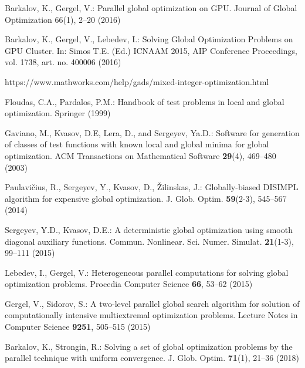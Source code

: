 \documentclass[runningheads]{llncs}
\begin{document}
\begin{thebibliography}{10}
Barkalov, K., Gergel, V.: Parallel global optimization on GPU. Journal of Global Optimization
66(1), 2--20 (2016)

Barkalov, K., Gergel, V., Lebedev, I.: Solving Global Optimization Problems on GPU Cluster.
In: Simos T.E. (Ed.) ICNAAM 2015, AIP Conference Proceedings, vol. 1738, art. no. 400006
(2016)

https://www.mathworks.com/help/gads/mixed-integer-optimization.html

Floudas, C.A., Pardalos, P.M.:  Handbook of test problems in local and global optimization.
Springer (1999)  %

 Gaviano, M., Kvasov, D.E, Lera, D., and Sergeyev, Ya.D.: Software for
generation of classes of test functions with known local and global minima for global
optimization. ACM Transactions on Mathematical Software \textbf{29}(4), 469--480 (2003)

Paulavi\v{c}ius, R., Sergeyev, Y., Kvasov, D., \v{Z}ilinskas, J.: Globally-biased DISIMPL
algorithm for expensive global optimization. J. Glob. Optim. \textbf{59}(2-3), 545--567 (2014)

Sergeyev, Y.D., Kvasov, D.E.: A deterministic global optimization using smooth diagonal
auxiliary functions. Commun. Nonlinear. Sci. Numer. Simulat. \textbf{21}(1-3), 99--111 (2015)

Lebedev, I., Gergel, V.: Heterogeneous parallel computations for solving global optimization
problems. Procedia Computer Science \textbf{66}, 53--62 (2015)

Gergel, V., Sidorov, S.: A two-level parallel global search algorithm for solution of
computationally intensive multiextremal optimization problems. Lecture Notes in Computer
Science  \textbf{9251}, 505--515 (2015)

Barkalov, K., Strongin, R.: Solving a set of global optimization problems by the parallel technique with uniform convergence. J. Glob. Optim. \textbf{71}(1), 21--36 (2018)


\end{thebibliography}
\end{document}
